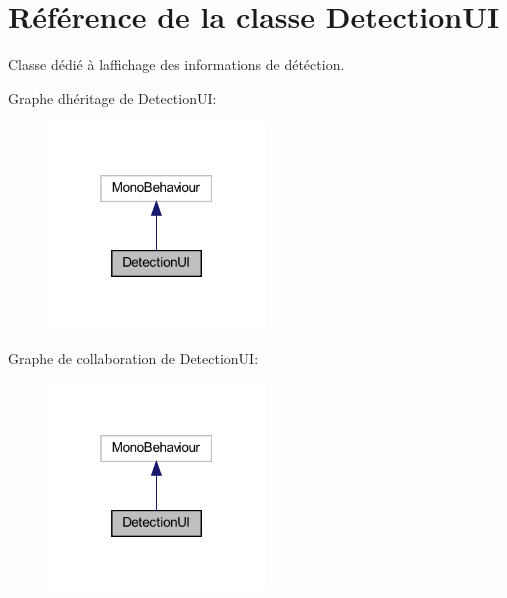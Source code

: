 \hypertarget{class_detection_u_i}{}\section{Référence de la classe Detection\+UI}
\label{class_detection_u_i}


Classe dédié à l\textquotesingle{}affichage des informations de détéction.  




Graphe d\textquotesingle{}héritage de Detection\+UI\+:\nopagebreak
\begin{figure}[H]
\begin{center}
\leavevmode
\includegraphics[width=163pt]{class_detection_u_i__inherit__graph}
\end{center}
\end{figure}


Graphe de collaboration de Detection\+UI\+:\nopagebreak
\begin{figure}[H]
\begin{center}
\leavevmode
\includegraphics[width=163pt]{class_detection_u_i__coll__graph}
\end{center}
\end{figure}

